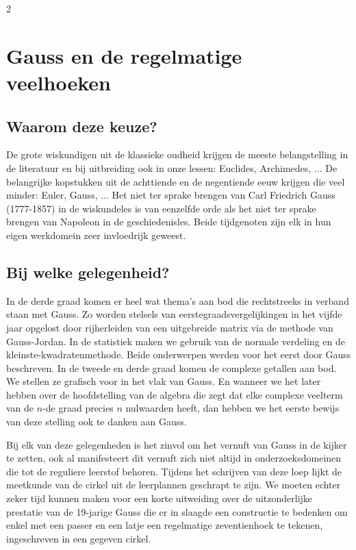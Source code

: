 \begin{multicols}{2}
\clearpage
\section{Gauss en de regelmatige veelhoeken}
\subsection*{Waarom deze keuze?}
	De grote wiskundigen uit de klassieke oudheid krijgen de meeste belangstelling in de literatuur en bij uitbreiding ook in onze lessen: Euclides, Archimedes, ... De belangrijke kopstukken uit de achttiende en de negentiende eeuw krijgen die veel minder: Euler, Gauss, ... Het niet ter sprake brengen van Carl Friedrich Gauss (1777-1857) in de wiskundeles is van eenzelfde orde als het niet ter sprake brengen van Napoleon in de geschiedenisles. Beide tijdgenoten zijn elk in hun eigen werkdomein zeer invloedrijk geweest. 
	
	\subsection*{Bij welke gelegenheid?}
	In de derde graad komen er heel wat thema's aan bod die rechtstreeks in verband staan met Gauss. Zo worden stelsels van eerstegraadsvergelijkingen in het vijfde jaar opgelost door rijherleiden van een uitgebreide matrix via de methode van Gauss-Jordan. In de statistiek maken we gebruik van de normale verdeling en de kleinste-kwadratenmethode. Beide onderwerpen werden voor het eerst door Gauss beschreven. In de tweede en derde graad komen de complexe getallen aan bod. We stellen ze grafisch voor in het vlak van Gauss. En wanneer we het later hebben over de hoofdstelling van de algebra die zegt dat elke complexe veelterm van de $n$-de graad precies $n$ nulwaarden heeft, dan hebben we het eerste bewijs van deze stelling ook te danken aan Gauss.
	
	Bij elk van deze gelegenheden is het zinvol om het vernuft van Gauss in de kijker te zetten, ook al manifesteert dit vernuft zich niet altijd in onderzoeksdomeinen die tot de reguliere leerstof behoren. Tijdens het schrijven van deze loep lijkt de meetkunde van de cirkel uit de leerplannen geschrapt te zijn. We moeten echter zeker tijd kunnen maken voor een korte uitweiding over de uitzonderlijke prestatie van de 19-jarige Gauss die er in slaagde een constructie te bedenken om enkel met een passer en een latje een regelmatige zeventienhoek te tekenen, ingeschreven in een gegeven cirkel. 
	

\end{multicols}
